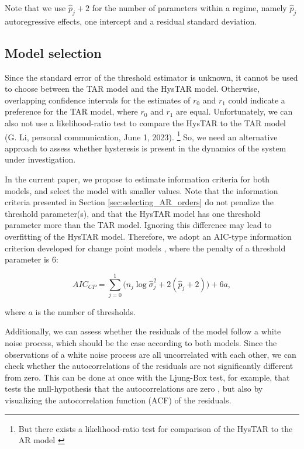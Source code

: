 \documentclass{article}
\begin{document}
Note that we use $\hat{p}_j + 2$ for the number of parameters within a regime, namely $\hat{p}_j$ autoregressive effects, one intercept and a residual standard deviation.

\subsection{Model selection} \label{sec:model_selection}
Since the standard error of the threshold estimator is unknown, it cannot be used to choose between the TAR model and the HysTAR model.
Otherwise, overlapping confidence intervals for the estimates of $r_0$ and $r_1$ could indicate a preference for the TAR model, where $r_0$ and $r_1$ are equal.
Unfortunately, we can also not use a likelihood-ratio test to compare the HysTAR to the TAR model (G. Li, personal communication, June 1, 2023).
\footnote{But there exists a likelihood-ratio test for comparison of the HysTAR to the AR model \citep{bar1}}
So, we need an alternative approach to assess whether hysteresis is present in the dynamics of the system under investigation.

In the current paper, we propose to estimate information criteria for both models, and select the model with smaller values.
Note that the information criteria presented in Section \ref{sec:selecting_AR_orders} do not penalize the threshold parameter(s), and that the HysTAR model has one threshold parameter more than the TAR model.
Ignoring this difference may lead to overfitting of the HysTAR model.
Therefore, we adopt an AIC-type information criterion developed for change point models \citep[AICcp][]{aiccp}, where the penalty of a threshold parameter is 6:

\begin{equation}
\label{eq:aiccp}
AIC_{CP} = \sum_{j = 0}^{1} \Big(n_j \log \hat{\sigma}_{j}^2 + 2(\hat{p}_j + 2) \Big) + 6a,
\end{equation}

where $a$ is the number of thresholds.

Additionally, we can assess whether the residuals of the model follow a white noise process, which should be the case according to both models.
Since the observations of a white noise process are all uncorrelated with each other, we can check whether the autocorrelations of the residuals are not significantly different from zero.
This can be done at once with the Ljung-Box test, for example, that tests the null-hypothesis that the autocorrelations are zero \citep{ljungbox}, but also by visualizing the autocorrelation function (ACF) of the residuals.
\end{document}
